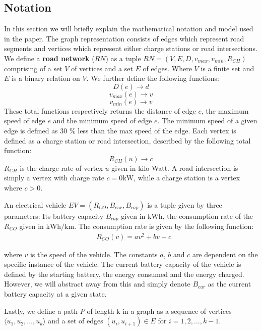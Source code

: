 \subsection{Notation}
In this section we will briefly explain the mathematical notation and model used in the paper. The graph representation consists of edges which represent road segments and vertices which represent either charge stations or road intersections. We define a \textbf{road network} ($RN$) as a tuple $RN=(V,E,D,v_{max},v_{min},R_{CH})$ comprising of a set $V$ of vertices and a set $E$ of edges. Where $V$ is a finite set and $E$ is a binary relation on $V$. We further define the following functions:
\[ D(e)\rightarrow d \] 
\[ v_{max}(e)\rightarrow v \]
\[ v_{min}(e)\rightarrow v \]
These total functions respectively returns the distance of edge $e$, the maximum speed of edge $e$ and the minimum speed of edge $e$. The minimum speed of a given edge is defined as 30 \% less than the max speed of the edge. Each vertex is defined as a charge station or road intersection, described by the following total function:
\[R_{CH}(u)\rightarrow c\]
$R_{CH}$ is the charge rate of vertex $u$ given in kilo-Watt. A road intersection is simply a vertex with charge rate $c = 0\si{\kW}$, while a charge station is a vertex where $c > 0$.

An electrical vehicle $EV=(R_{CO},B_{cur},B_{cap})$ is a tuple given by three parameters: Its battery capacity $B_{cap}$ given in $\si{\kWh}$, the consumption rate of the $R_{CO}$ given in $\si{\kWh\per\km}$. The consumption rate is given by the following function:
\begin{equation}
\begin{aligned}
 & R_{CO}(v)=av^2+bv+c
\end{aligned}
\end{equation}\label{eq:chargingFunc}

where $v$ is the speed of the vehicle. The constants $a$, $b$ and $c$ are dependent on the specific instance of the vehicle. The current battery capacity of the vehicle is defined by the starting battery, the energy consumed and the energy charged. However, we will abstract away from this and simply denote $B_{cur}$ as the current battery capacity at a given state.

Lastly, we define a path $P$ of length k in a graph as a sequence of vertices $\langle u_1,u_2,\dots,u_k \rangle$ and a set of edges $(u_{i},u_{i+1})\in E$ for $i=1,2,\dots,k-1$.


